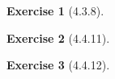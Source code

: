 \documentclass{amsart}
\theoremstyle{definition}
\newtheorem{exercise}{Exercise}
\begin{document}
\begin{exercise}[4.3.8]
\end{exercise}

\begin{exercise}[4.4.11]
\end{exercise}

\begin{exercise}[4.4.12]
\end{exercise}
\end{document}
